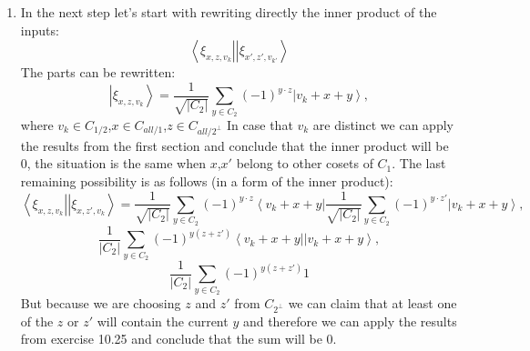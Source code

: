 \documentclass[a4paper,10pt]{article}
\newcommand{\bra}[1]{\ensuremath{\left\langle#1\right|}} %
\newcommand{\ket}[1]{\ensuremath{\left|#1\right\rangle}} %
\begin{document}
\begin{enumerate}[1.]
\item In the next step let's  start with rewriting directly the inner product of the inputs:
$$
\bra{\xi_{x,z,v_k}}\ket{\xi_{x',z',v_{k'}}}
$$
The parts can be rewritten:
$$
\ket{\xi_{x,z,v_k}} = \frac{1}{\sqrt{|C_2|}} \sum_{y \in C_2} (-1)^{y \cdot z} \ket{v_k + x + y},
$$
where $v_k \in  C_{1/2}$,$x\in C_{all/1}$,$z \in C_{all/2^\bot}$
In case that $v_k$ are distinct we can apply the results from the first section and conclude that the inner product will be 0, the situation is the same when $x$,$x'$ belong to other cosets of $C_1$. The last remaining possibility is as follows (in a form of the inner product):
$$
\bra{\xi_{x,z,v_k}}\ket{\xi_{x,z',v_k}} = \frac{1}{\sqrt{|C_2|}} \sum_{y \in C_2} (-1)^{y \cdot z} \bra{v_k + x + y} \frac{1}{\sqrt{|C_2|}} \sum_{y \in C_2} (-1)^{y \cdot z'} \ket{v_k + x + y},
$$
$$
\frac{1}{|C_2|} \sum_{y \in C_2} (-1)^{y(z+z')} \bra{v_k + x + y}   \ket{v_k + x + y},
$$
$$
\frac{1}{|C_2|} \sum_{y \in C_2} (-1)^{y(z+z')} 1
$$
But because we are choosing $z$ and $z'$ from $C_{2^\bot}$ we can claim that at least one of the $z$ or $z'$ will contain the current $y$ and therefore we can apply the results from exercise 10.25 and conclude that the sum will be 0.
\end{enumerate}
\end{document}
